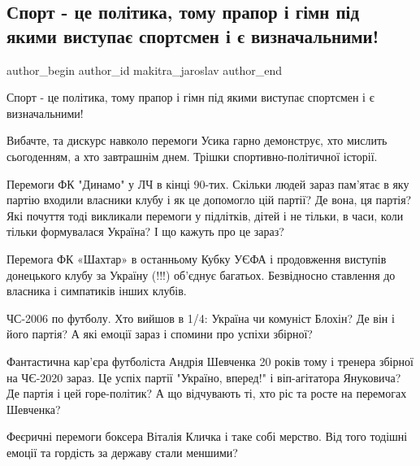  
 
 
 
 
 
\subsection{Спорт - це політика, тому прапор і гімн під якими виступає спортсмен і є визначальними!}
\label{sec:26_09_2021.fb.makitra_jaroslav.1.sport_politika_flag_usik}
 
\ifcmt
 author_begin
   author_id makitra_jaroslav
 author_end
\fi

Спорт - це політика, тому прапор і гімн під якими виступає спортсмен і є
визначальними! 

Вибачте, та дискурс навколо перемоги Усика гарно демонструє, хто мислить
сьогоденням, а хто завтрашнім днем. Трішки спортивно-політичної історії. 

Перемоги ФК "Динамо" у ЛЧ в кінці 90-тих. Скільки людей зараз пам'ятає в яку
партію входили власники клубу і як це допомогло цій партії? Де вона, ця партія?
Які почуття тоді викликали перемоги у підлітків, дітей і не тільки, в часи,
коли тільки формувалася Україна? І що кажуть про це зараз?

Перемога ФК «Шахтар» в останньому Кубку УЄФА і продовження виступів донецького
клубу за Україну (!!!) об’єднує багатьох. Безвідносно ставлення до власника і
симпатиків інших клубів. 

ЧС-2006 по футболу. Хто вийшов в 1/4: Україна чи комуніст Блохін? Де він і його
партія? А які емоції зараз і спомини про успіхи збірної? 

Фантастична кар'єра футболіста Андрія Шевченка 20 років тому і тренера збірної
на ЧЄ-2020 зараз. Це успіх партії "Україно, вперед!" і віп-агітатора Януковича?
Де партія і цей горе-політик? А що відчувають ті, хто ріс та росте на перемогах
Шевченка? 

Феєричні перемоги боксера Віталія Кличка і таке собі мерство. Від того тодішні
емоції та гордість за державу стали меншими?

